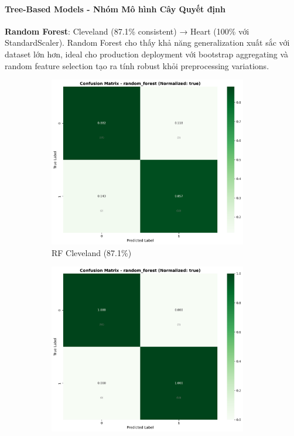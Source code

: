 \paragraph{Tree-Based Models - Nhóm Mô hình Cây Quyết định}

\textbf{Random Forest}: Cleveland (87.1\% consistent) → Heart (100\% với StandardScaler). Random Forest cho thấy khả năng generalization xuất sắc với dataset lớn hơn, ideal cho production deployment với bootstrap aggregating và random feature selection tạo ra tính robust khỏi preprocessing variations.

\begin{figure}[H]
\centering
\begin{subfigure}[b]{0.31\textwidth}
\centering
\includegraphics[width=0.95\textwidth]{Result/cleveland_dataset/confusion_matrices/random_forest_numeric_dataset_StandardScaler.png}
\caption{RF Cleveland (87.1\%)}
\label{fig:ra-rf_performance_standard}
\end{subfigure}
\hfill
\begin{subfigure}[b]{0.31\textwidth}
\centering
\includegraphics[width=0.95\textwidth]{Result/heart_dataset/confusion_matrices/random_forest_numeric_dataset_StandardScaler.png}

\end{subfigure}
\end{figure}
